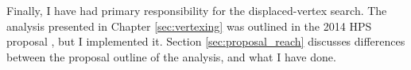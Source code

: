 Finally, I have had primary responsibility for the displaced-vertex search.
The analysis presented in Chapter \ref{sec:vertexing} was outlined in the 2014 HPS proposal \cite{collaboration_heavy_2013}, but I implemented it.
Section \ref{sec:proposal_reach} discusses differences between the proposal outline of the analysis, and what I have done.